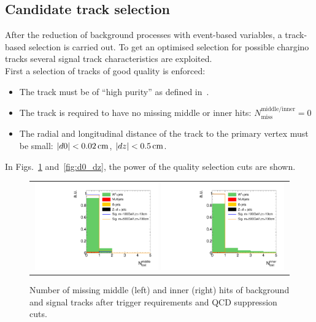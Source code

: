 \subsection{Candidate track selection}
\label{sec:CandidateTrackSelection}
After the reduction of background processes with event-based variables, a track-based selection is carried out.
To get an optimised selection for possible chargino tracks several signal track characteristics are exploited.\\

First a selection of tracks of good quality is enforced:
\begin{itemize}
\renewcommand{\labelitemi}{\footnotesize{\ding{118}}}
\item The track must be of ``high purity'' as defined in~\cite{bib:CMS:Tracking_2010}.
\item The track is required to have no missing middle or inner hits: $N_{\text{miss}}^{\text{middle/inner}}=0$
\item The radial and longitudinal  distance of the track to the primary vertex must be small: \mbox{$|d0|<0.02\,\text{cm}$}, \mbox{$|dz|<0.5\,\text{cm}$}.
\end{itemize}
In Figs.~\ref{fig:LostHits} and~\ref{fig:d0_dz}, the power of the quality selection cuts are shown.\\
\begin{figure}[!b]
  \centering 
  \begin{tabular}{c}
    \includegraphics[width=0.49\textwidth]{figures/analysis/AnalysisSelection/chiTracksQCDsupressionTrigger_2Signals_FullBkg/htrackNLostMid_lin.pdf}
    \includegraphics[width=0.49\textwidth]{figures/analysis/AnalysisSelection/chiTracksQCDsupressionTrigger_2Signals_FullBkg/htrackNLostInner_lin.pdf}
  \end{tabular}
  \caption{Number of missing middle (left) and inner (right) hits of background and signal tracks after trigger requirements and QCD suppression cuts.}
  \label{fig:LostHits}
\end{figure}
